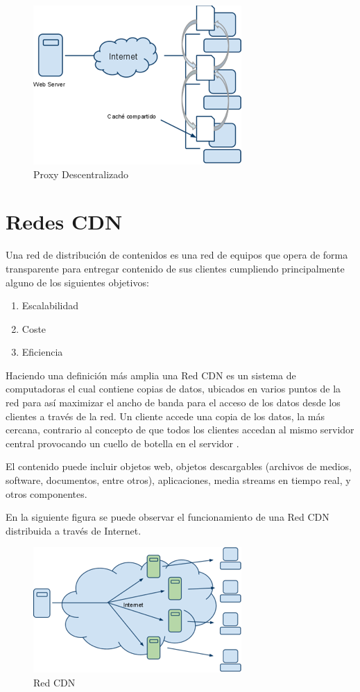 \begin{figure}[h]
  \centering
    \includegraphics[scale=1]{gfx/proxy_descentralizado}
  \caption{Proxy Descentralizado}
  \label{proxy_descentralizado}
\end{figure}

\section{Redes CDN}
Una red de distribución de contenidos es una red de equipos que opera de forma transparente para entregar contenido de sus clientes cumpliendo principalmente alguno de los siguientes objetivos:
\begin{enumerate}
\item Escalabilidad
\item Coste
\item Eficiencia
\end{enumerate}

Haciendo una definición más amplia una Red CDN es un sistema de computadoras el cual contiene copias de datos, ubicados en varios puntos de la red para así maximizar el ancho de banda para el acceso de los datos desde los clientes a través de la red. Un cliente accede una copia de los datos, la más cercana, contrario al concepto de que todos los clientes accedan al mismo servidor central provocando un cuello de botella en el servidor \cite{wiki_cdn}.

El contenido puede incluir objetos web, objetos descargables (archivos de medios, software, documentos, entre otros), aplicaciones, media streams en tiempo real, y otros componentes.

En la siguiente figura se puede observar el funcionamiento de una Red CDN distribuida a través de Internet.

\begin{figure}[h]
  \centering
    \includegraphics[scale=1]{gfx/redes_cdn}
  \caption{Red CDN}
  \label{redes_cdn}
\end{figure}
